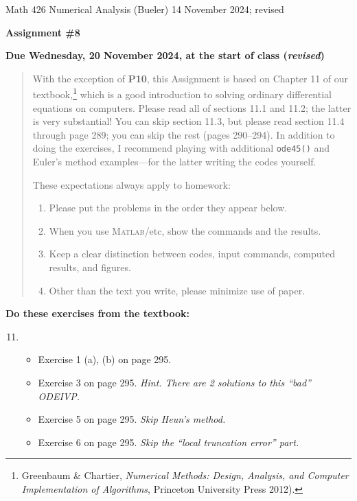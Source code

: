 \documentclass[12pt]{amsart}
\newcommand{\Matlab}{\textsc{Matlab}\xspace}
\begin{document}
\scriptsize \noindent Math 426 Numerical Analysis (Bueler) \hfill {\color{BrickRed} 14 November 2024; revised}
\normalsize

\medskip\bigskip

\Large\centerline{\textbf{Assignment \#8}}
\large
\bigskip

\centerline{{\color{BrickRed} \textbf{Due Wednesday, 20 November 2024, at the start of class (\emph{revised})}}}
\medskip
\normalsize

\thispagestyle{empty}

\begin{quote}
{\small
With the exception of \textbf{P10}, this Assignment is based on Chapter 11 of our textbook,\footnote{Greenbaum \& Chartier, \emph{Numerical Methods: Design, Analysis, and Computer Implementation of Algorithms}, Princeton University Press 2012).} which is a good introduction to solving ordinary differential equations on computers.  Please read all of sections 11.1 and 11.2; the latter is very substantial!  You can skip section 11.3, but please read section 11.4 through page 289; you can skip the rest (pages 290--294).  In addition to doing the exercises, I recommend playing with additional \texttt{ode45()} and Euler's method examples---for the latter writing the codes yourself.

\medskip
\noindent These expectations always apply to homework:
\renewcommand{\labelenumi}{\arabic{enumi}.\,}
\begin{enumerate}
\item Please put the problems in the order they appear below.
\item When you use \Matlab/etc, show the commands and the results.
\item Keep a clear distinction between codes, input commands, computed results, and figures.
\item Other than the text you write, please minimize use of paper.
\end{enumerate}
}
\end{quote}

\bigskip
\noindent \textbf{Do these exercises from the textbook:}

\smallskip
\renewcommand{\labelenumi}{{\footnotesize\underline{\textsc{Chapter \arabic{enumi}}}}}
\begin{enumerate}
\setcounter{enumi}{10}
\item ~
    \begin{itemize}
    \item Exercise 1 (a), (b) on page 295.
    \item Exercise 3 on page 295. \quad \emph{Hint.  There are 2 solutions to this ``bad'' ODEIVP.}
    \item Exercise 5 on page 295. \quad \emph{Skip Heun's method.}
    \item Exercise 6 on page 295. \quad \emph{Skip the ``local truncation error'' part.}
    \end{itemize}
\end{enumerate}
\end{document}

